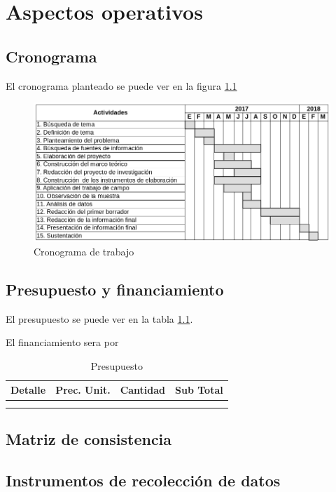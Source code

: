\chapter{Aspectos operativos}
\section{Cronograma}
El cronograma planteado se puede ver en la figura \ref{fig:cronograma}

\begin{figure}[h]
    \centering
    \captionsetup{justification=centering}
    \includegraphics[width=1.0\textwidth]{Imagenes/Bitmap/cronograma}
    \caption{Cronograma de trabajo}
    \label{fig:cronograma}
\end{figure}

\section{Presupuesto y financiamiento}
El presupuesto se puede ver en la tabla \ref{t:presupuesto}.

El financiamiento sera por

\begin{table}[]
  \centering
  \caption{Presupuesto}
  \label{t:presupuesto}
  \begin{tabular}{|l|l|l|l|}
    \hline
    Detalle & Prec. Unit. & Cantidad & Sub Total \\ \hline
    &  &  &  \\ \hline
    &  &  &  \\ \hline
  \end{tabular}
\end{table}

\section{Matriz de consistencia}
\section{Instrumentos de recolecci\'on de datos}
